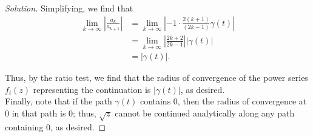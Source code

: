 \documentclass[11pt]{article}
\newenvironment{solution}
  {\renewcommand\qedsymbol{$\blacksquare$}\begin{proof}[Solution]}
  {\end{proof}}
\theoremstyle{definition}
\begin{document}
\begin{solution}
Simplifying, we find that
\begin{align*} \lim\limits_{k \rightarrow \infty} \left| \frac{a_k}{a_{k+1}}\right| &=  \lim\limits_{k \rightarrow \infty} \left|-1 \cdot \frac{2(k+1)}{(2k-1)} \gamma(t) \right| \\
&= \lim\limits_{k \rightarrow \infty} \left|\frac{2k+2}{2k-1}\right| \left|\gamma(t) \right| \\
&= |\gamma(t)|.\end{align*}

Thus, by the ratio test, we find that the radius of convergence of the power series $f_t(z)$ representing the continuation is $|\gamma(t)|$, as desired. \\

Finally, note that if the path $\gamma(t)$ contains $0$, then the radius of convergence at $0$ in that path is $0$; thus, $\sqrt{z}$ cannot be continued analytically along any path containing $0$, as desired.\end{solution}
\end{document}
